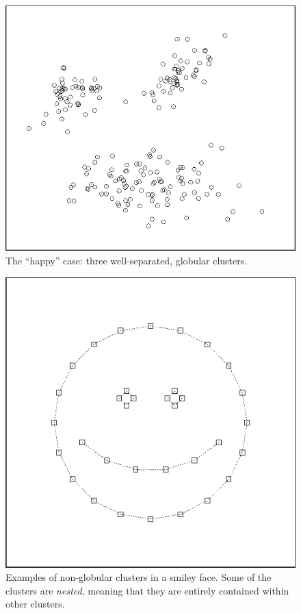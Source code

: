 \begin{figure}
  \centerline{\includegraphics{img/clouds}}
  \caption{The ``happy'' case: three well-separated, globular clusters.}
  \label{fig:clouds}
\end{figure}


\begin{figure}
  \centerline{\includegraphics{img/smiley}}
  \caption{Examples of non-globular clusters in a smiley face. Some of
    the clusters are \emph{nested}, meaning that they are entirely
    contained within other clusters.}
  \label{fig:smiley}\vspace*{-6pt}
\end{figure}

